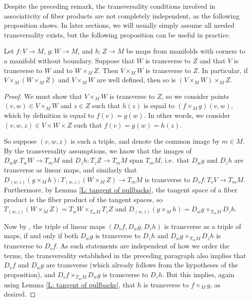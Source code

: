 Despite the preceding remark, the transversality conditions involved in associativity of fiber products are not completely independent, as the following proposition shows. In later sections, we will usually simply assume all needed transversality exists, but the following proposition can be useful in practice.

\begin{proposition}\label{P: 3 out of 4 trans}
Let $f:V\to M$, $g:W\to M$, and $h:Z\to M$ be maps from manifolds with corners to a manifold without boundary. Suppose that $W$ is transverse to $Z$ and that $V$ is transverse to $W$ and to $W\times_MZ$. Then $V\times_MW$ is transverse to $Z$. In particular, if $V\times_M(W\times_MZ)$ and $V\times_MW$ are well defined, then so is $(V\times_MW)\times_M Z$.
\end{proposition}
\begin{proof}
We must show that $V\times_MW$ is transverse to $Z$, so we consider points $(v,w)\in V\times_M W$ and $z\in Z$ such that $h(z)$ is equal to $(f\times_Mg)(v,w)$, which by definition is equal to $f(v)=g(w)$. In other words, we consider  $(v,w,z)\in V\times W\times Z$ such that $f(v)=g(w)=h(z)$. 

So suppose $(v,w,z)$ is such a triple, and denote the common image by $m\in M$.  By the transversality assumptions, we know that the images of $D_wg:T_wW\to T_mM$ and $D_zh:T_zZ\to T_mM$ span $T_mM$, i.e.\ that $D_wg$ and $D_zh$ are transverse as linear maps, and similarly that $D_{(w,z)}(g\times_M h):T_{(w,z)}(W\times_M Z)\to T_mM$ is transverse to $D_vf:T_vV\to T_mM$. Furthermore, by  Lemma \ref{L: tangent of pullbacks},  the tangent space of a fiber product is the fiber product of the tangent spaces, so $T_{(w,z)}(W\times_M Z)=T_wW\times_{T_mM}T_zZ$ and $D_{(w,z)}(g\times_M h)=D_wg\times_{T_mM}D_zh$. 

Now by \cite[Propositions~4-9]{RamBas09}, the triple of linear maps $(D_vf,D_wg,D_zh)$ is transverse as a triple of maps, if and only if both $D_wg$ is transverse to $D_zh$ and $D_wg\times_{T_mM}D_zh$ is transverse to $D_vf$. As such statements are independent of how we order the terms, the transversality established in the preceding paragraph also implies that $D_vf$ and $D_wg$ are transverse (which already follows from the hypotheses of the proposition), and $D_vf\times_{T_mM}D_wg$ is transverse to $D_zh$. But this implies, again using Lemma \ref{L: tangent of pullbacks}, that $h$ is transverse to $f\times_Mg$, as desired.  
\end{proof}

